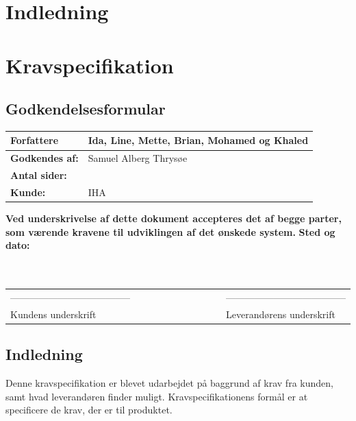 \chapter{Indledning}

\chapter{Kravspecifikation}
\section{Godkendelsesformular}
\begin{table}[h!]
\label{tab:tabel2}
\begin{tabular}{| l | >{\raggedright\arraybackslash}p{12cm} |}
   \hline
   \textbf{Forfattere} & Ida, Line, Mette, Brian, Mohamed og Khaled\\ \hline
   \textbf{Godkendes af:} & Samuel Alberg Thrysøe\\ \hline
   \textbf{Antal sider:} & \\ \hline
   \textbf{Kunde:} & IHA\\ \hline
\end{tabular}
\end{table}
\textbf{Ved underskrivelse af dette dokument accepteres det af begge parter, som værende kravene til udviklingen af det ønskede system.}
\newline
\textbf{Sted og dato:}\\
\\
\\
\begin{table}
[h!]
\begin{tabular}{ l lllllllll l}
--------------------------------------&&&&&&&&&&--------------------------------------\\ 
Kundens underskrift &&&&&&&&&&Leverandørens underskrift\\
\end{tabular}
\end{table}
\section{Indledning}
Denne kravspecifikation er blevet udarbejdet på baggrund af krav fra kunden, samt hvad leverandøren finder muligt. Kravspecifikationens formål er at specificere de krav, der er til produktet. 
\newpage

